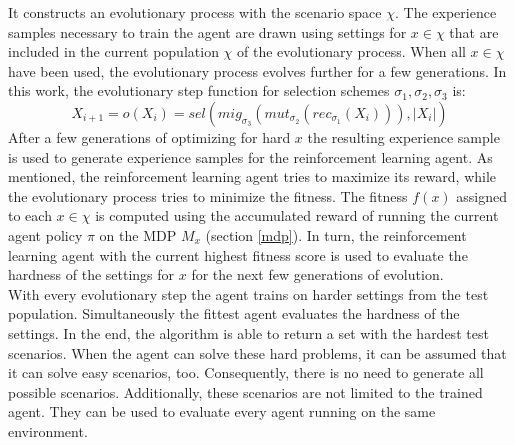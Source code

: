 It constructs an evolutionary process with the scenario space $\chi$. The experience samples necessary to train the agent are drawn using settings for $x \in \chi$ that are included in the current population $\chi$ of the evolutionary process. When all $x \in \chi$ have been used, the evolutionary process evolves further for a few generations. In this work, the evolutionary step function for selection schemes $\sigma_1, \sigma_2, \sigma_3$ is:
\begin{equation}
X_{i+1} = o(X_i) = sel(mig_{\sigma_3}(mut_{\sigma_2}(rec_{\sigma_1}(X_i))),|X_i|)
\end{equation}
After a few generations of optimizing for hard $x$ the resulting experience sample is used to generate experience samples for the reinforcement learning agent. As mentioned, the reinforcement learning agent tries to maximize its reward, while the evolutionary process tries to minimize the fitness. The fitness $f(x)$ assigned to each $x \in \chi$ is computed using the accumulated reward of running the current agent policy $\pi$ on the MDP $M_x$ (section \ref{mdp}).
In turn, the reinforcement learning agent with the current highest fitness score is used to evaluate the hardness of the settings for $x$ for the next few generations of evolution.\\
With every evolutionary step the agent trains on harder settings from the test population. Simultaneously the fittest agent evaluates the hardness of the settings. In the end, the algorithm is able to return a set with the hardest test scenarios. When the agent can solve these hard problems, it can be assumed that it can solve easy scenarios, too. Consequently, there is no need to generate all possible scenarios. Additionally, these scenarios are not limited to the trained agent. They can be used to evaluate every agent running on the same environment.